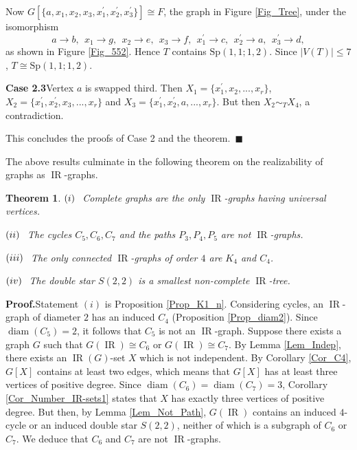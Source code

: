 \documentclass[12pt]{article}%
\newtheorem{theorem}{Theorem}[section]
\begin{document}
Now $G[\{a,x_{1},x_{2},x_{3},x_{1}^{\prime},x_{2}^{\prime},x_{3}^{\prime
}\}]\cong F$, the graph in Figure \ref{Fig_Tree}, under the isomorphism
\[
a\rightarrow b,\ \ x_{1}\rightarrow g,\ \ x_{2}\rightarrow e,\ \ x_{3}%
\rightarrow f,\ \ x_{1}^{\prime}\rightarrow c,\ \ x_{2}^{\prime}\rightarrow
a,\ \ x_{3}^{\prime}\rightarrow d,
\]
as shown in Figure \ref{Fig_552}. Hence $T$ contains $\mathrm{Sp}(1,1;1,2)$.
Since $|V(T)|\leq7$, $T\cong\mathrm{Sp}(1,1;1,2)$.\medskip

\noindent\textbf{Case 2.3\hspace{0.1in}}Vertex $a$ is swapped third. Then
$X_{1}=\{x_{1}^{\prime},x_{2},...,x_{r}\}$, $X_{2}=\{x_{1}^{\prime}%
,x_{2}^{\prime},x_{3},...,x_{r}\}$ and $X_{3}=\{x_{1}^{\prime},x_{2}^{\prime
},a,...,x_{r}\}$. But then $X_{2}\sim_{T}X_{4}$, a contradiction.\medskip

This concludes the proofs of Case 2 and the theorem.~$\blacksquare$

\bigskip

The above results culminate in the following theorem on the realizability of
graphs as $\operatorname{IR}$-graphs.

\begin{theorem}
\label{Thm_Main}$(i)\hspace{0.1in}$Complete graphs are the only
$\operatorname{IR}$-graphs having universal vertices.

$(ii)\hspace{0.1in}$The cycles $C_{5},C_{6},C_{7}$ and the paths $P_{3}%
,P_{4},P_{5}$ are not $\operatorname{IR}$-graphs. 

$(iii)\hspace{0.1in}$The only connected $\operatorname{IR}$-graphs of order
$4$ are $K_{4}$ and $C_{4}$. 

$(iv)\hspace{0.1in}$The double star $S(2,2)$ is a smallest non-complete
$\operatorname{IR}$-tree.
\end{theorem}

\noindent\textbf{Proof.\hspace{0.1in}}Statement $(i)$ is Proposition
\ref{Prop_K1_n}. Considering cycles, an $\operatorname{IR}$-graph of diameter
$2$ has an induced $C_{4}$ (Proposition \ref{Prop_diam2}). Since
$\operatorname{diam}(C_{5})=2$, it follows that $C_{5}$ is not an
$\operatorname{IR}$-graph. Suppose there exists a graph $G$ such that
$G(\operatorname{IR})\cong C_{6}$ or $G(\operatorname{IR})\cong C_{7}$. By
Lemma \ref{Lem_Indep}, there exists an $\operatorname{IR}(G)$-set $X$ which is
not independent. By Corollary \ref{Cor_C4}, $G[X]$ contains at least two
edges, which means that $G[X]$ has at least three vertices of positive degree.
Since $\operatorname{diam}(C_{6})=\operatorname{diam}(C_{7})=3$, Corollary
\ref{Cor_Number_IR-sets1} states that $X$ has exactly three vertices of
positive degree. But then, by Lemma \ref{Lem_Not_Path}, $G(\operatorname{IR})$
contains an induced $4$-cycle or an induced double star $S(2,2)$, neither of
which is a subgraph of $C_{6}$ or $C_{7}$. We deduce that $C_{6}$ and $C_{7}$
are not $\operatorname{IR}$-graphs.
\end{document}
